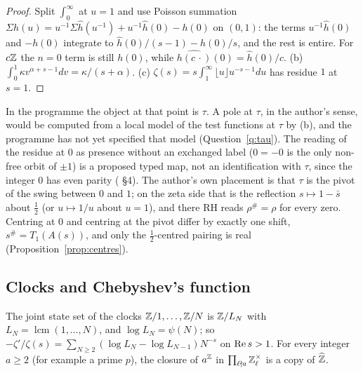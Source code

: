 \begin{proof}
Split $\int_0^\infty$ at $u=1$ and use Poisson summation $\Sigma h(u)=u^{-1}\Sigma\hat h(u^{-1})+u^{-1}\hat h(0)-h(0)$ on $(0,1)$: the terms $u^{-1}\hat h(0)$ and $-h(0)$ integrate to $\hat h(0)/(s-1)-h(0)/s$, and the rest is entire. For $c\mathbb{Z}$ the $n=0$ term is still $h(0)$, while $\widehat{h(c\,\cdot)}(0)=\hat h(0)/c$. (b) $\int_0^1\kappa v^{\alpha+s-1}dv=\kappa/(s+\alpha)$. (c) $\zeta(s)=s\int_1^\infty\lfloor u\rfloor u^{-s-1}du$ has residue $1$ at $s=1$.
\end{proof}

In the programme the object at that point is $\tau$. A pole at $\tau$, in the author's sense, would be computed from a local model of the test functions at $\tau$ by (b), and the programme has not yet specified that model (Question~\ref{q:tau}). The reading of the residue at $0$ as presence without an exchanged label ($0=-0$ is the only non-free orbit of $\pm1$) is a proposed typed map, not an identification with $\tau$, since the integer $0$ has even parity ( §4). The author's own placement is that $\tau$ is the pivot of the swing between $0$ and $1$; on the zeta side that is the reflection $s\mapsto1-\bar s$ about $\tfrac12$ (or $u\mapsto1/u$ about $u=1$), and there RH reads $\rho^\#=\rho$ for every zero. Centring at $0$ and centring at the pivot differ by exactly one shift, $s^\#=T_1(A(s))$, and only the $\tfrac12$-centred pairing is real (Proposition~\ref{prop:centres}).

\subsection{Clocks and Chebyshev's function}

\begin{proposition}\label{prop:clocks}
The joint state set of the clocks $\mathbb{Z}/1,\dots,\mathbb{Z}/N$ is $\mathbb{Z}/L_N$ with $L_N=\operatorname{lcm}(1,\dots,N)$, and $\log L_N=\psi(N)$; so $-\zeta'/\zeta(s)=\sum_{N\ge2}(\log L_N-\log L_{N-1})N^{-s}$ on $\operatorname{Re} s>1$. For every integer $a\ge2$ (for example a prime $p$), the closure of $a^{\mathbb{Z}}$ in $\prod_{\ell\nmid a}\mathbb{Z}_\ell^\times$ is a copy of $\widehat{\mathbb{Z}}$.
\end{proposition}

